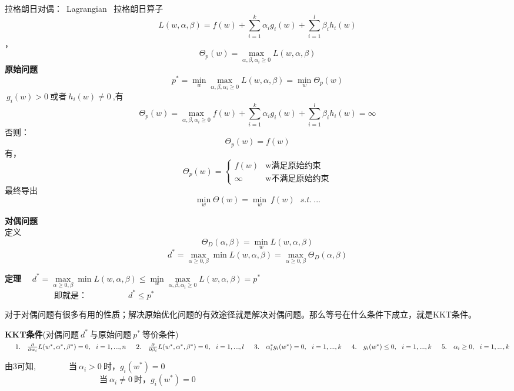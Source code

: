 拉格朗日对偶：~Lagrangian~ 拉格朗日算子
$$L(w,\alpha,\beta)=f(w)+\sum_{i=1}^{k}\alpha_ig_i(w)+\sum_{i=1}^{l}\beta_ih_i(w)$$
，
$$\Theta_p(w) = \max \limits_{\alpha,\beta,\alpha_i\geq0} L(w,\alpha,\beta)$$
\indent\textbf{原始问题}
$$p^*=\min \limits_w \max \limits_{\alpha,\beta,\alpha_i\geq0} L(w,\alpha,\beta) = \min\limits_w \Theta_p(w)$$
$~g_i(w)>0~$或者$~h_i(w)\neq 0~$,有
$$\Theta_p(w) = \max \limits_{\alpha,\beta,\alpha_i\geq0} f(w)+\sum_{i=1}^{k}\alpha_ig_i(w)+\sum_{i=1}^{l}\beta_ih_i(w)=\infty $$
\indent 否则：
$$\Theta_p(w) = f(w)$$
\indent 有，
\begin{equation}\nonumber
\Theta_p(w)=
\begin{cases}
f(w)& \text{w满足原始约束}\\
\infty&\text{w不满足原始约束}
\end{cases}
\end{equation}
\indent 最终导出
$$\min \limits_w \Theta(w) = \min \limits_w ~f(w)  ~~~s.t.~ ...$$

\textbf{对偶问题} ~~\\
\indent 定义
$$\Theta_D(\alpha,\beta)=\min \limits_w L(w,\alpha,\beta)$$
$$d^* = \max \limits_{\alpha\geq0,\beta} \min L(w,\alpha,\beta) = \max\limits_{\alpha\geq0,\beta} \Theta_D(\alpha,\beta)$$

\textbf{定理} ~~$d^* = \max \limits_{\alpha\geq0,\beta} \min L(w,\alpha,\beta)\leq \min \limits_w \max \limits_{\alpha,\beta,\alpha_i\geq0} L(w,\alpha,\beta) = p^*$ \\
\indent~~~~~~~~~~~~即就是：~~~~~~~~~~$d^*\leq p^*$

对于对偶问题有很多有用的性质；解决原始优化问题的有效途径就是解决对偶问题。那么等号在什么条件下成立，就是KKT条件。

\textbf{KKT条件}(对偶问题$~d^*~$与原始问题$~p^*~$等价条件)\\
$
\indent1.~~~\frac{\partial}{\partial w_i}L(w^*,\alpha^*,\beta^*) =0,~~i=1,...,n   \\
\indent2.~~~\frac{\partial}{\partial \beta_i}L(w^*,\alpha^*,\beta^*) =0,~~i=1,...,l  \\
\indent3.~~~\alpha_i^*g_i(w^*)=0,~~i=1,...,k\\
\indent4.~~~g_i(w^*)\leq0,~~i=1,...,k \\
\indent5.~~~\alpha_i\geq0,~~i=1,...,k
$

由3可知,~~~~~~~~当$~\alpha_i>0~$时，$g_i(w^*)=0$\\
\indent ~~~~~~~~~~~~~~~~~~~~~~~当$~\alpha_i\neq0~$时，$g_i(w^*)=0$

